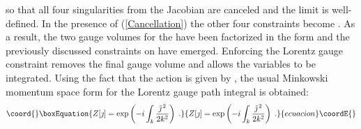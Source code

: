 \documentclass[a4paper,a4paper]{article}
\begin{document}
so that all four singularities from the Jacobian are canceled and the limit \coordHE{} is well-defined. In the presence of (\ref{Cancellation}) the other four constraints become \coordHE{}. As a result, the two gauge volumes for the \coordHE{} have been factorized in the form \coordHE{} and the previously discussed constraints on \coordHE{} have emerged. Enforcing the Lorentz gauge constraint \coordHE{} removes the final gauge volume and allows the \coordHE{} variables to be integrated. Using the fact that the action is given by \coordHE{}, the usual Minkowski momentum space form for the Lorentz gauge path integral is obtained:
\begin{equation}\coord{}\boxEquation{
\label{LorentzGauge}
Z [\jmath] = \exp \left( -  i \int_k  \frac{ \tilde{\jmath}^{\, 2} }{2 k^2} \right) \; .
}{
Z [\jmath] = \exp \left( -  i \int_k  \frac{ \tilde{\jmath}^{\, 2} }{2 k^2} \right) \; .
}{ecuacion}\coordE{}\end{equation}
\end{document}
